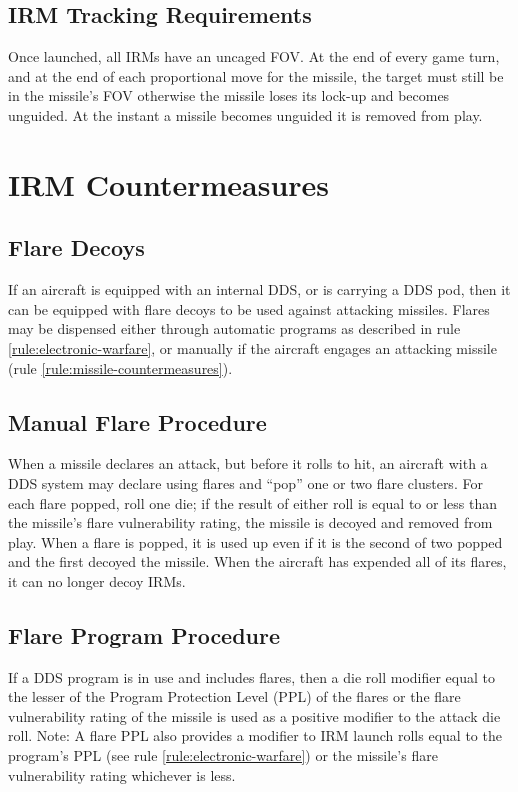
\subsection{IRM Tracking Requirements} Once launched, all IRMs have an uncaged FOV. At the end of every game turn, and at the end of each proportional move for the missile, the target must still be in the missile's FOV otherwise the missile loses its lock-up and becomes unguided. At the instant a missile becomes unguided it is removed from play.


\section{IRM Countermeasures}
\label{rule:irm-countermeasures}

\subsection{Flare Decoys} If an aircraft is equipped with an internal DDS, or is carrying a DDS pod, then it can be equipped with flare decoys to be used against attacking missiles. Flares may be dispensed either through automatic programs as described in rule \ref{rule:electronic-warfare}, or manually if the aircraft engages an attacking missile (rule \ref{rule:missile-countermeasures}).

\subsection{Manual Flare Procedure} When a missile declares an attack, but before it rolls to hit, an aircraft with a DDS system may declare using flares and “pop” one or two flare clusters. For each flare popped, roll one die; if the result of either roll is equal to or less than the missile's flare vulnerability rating, the missile is decoyed and removed from play. When a flare is popped, it is used up even if it is the second of two popped and the first decoyed the missile. When the aircraft has expended all of its flares, it can no longer decoy IRMs.

\subsection{Flare Program Procedure} If a DDS program is in use and includes flares, then a die roll modifier equal to the lesser of the Program Protection Level (PPL) of the flares or the flare vulnerability rating of the missile is used as a positive modifier to the attack die roll. Note: A flare PPL also provides a modifier to IRM launch rolls equal to the program's PPL (see rule \ref{rule:electronic-warfare}) or the missile's flare vulnerability rating whichever is less.

